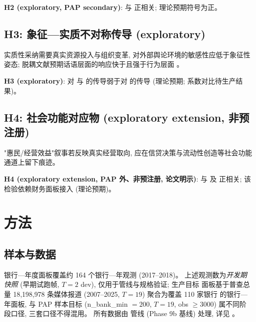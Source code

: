 \textbf{H2 (exploratory, PAP secondary)}:  与
 正相关; 理论预期符号为正。

\subsection{H3: 象征—实质不对称传导 (exploratory)}
实质性采纳需要真实资源投入与组织变革, 对外部舆论环境的敏感性应低于象征性
姿态; 脱耦文献预期话语层面的响应快于且强于行为层面
\parencite{kim2015greenwash,duchin2025greenwashing}。

\textbf{H3 (exploratory)}:  对
 与  的传导弱于对
 的传导 (理论预期; 系数对比待生产结果)。

\subsection{H4: 社会功能对应物 (exploratory extension, 非预注册)}
"惠民/经营效益"叙事若反映真实经营取向, 应在信贷决策与流动性创造等社会功能
通道上留下痕迹。

\textbf{H4 (exploratory extension, PAP 外、非预注册, 论文明示)}:
 与  及
 正相关; 该检验依赖财务面板接入 (理论预期)。

\section{方法}\label{sec:method}
\subsection{样本与数据}
银行—年度面板覆盖约 164 个银行—年观测 (2017--2018)。
上述观测数为\emph{开发期快照} (早期试跑帧, $T=2$ dev), 仅用于管线与规格验证; 生产目标
面板基于普查总量 18{,}198{,}978 条媒体报道 (2007--2025, $T=19$) 聚合为覆盖 110 家银行
的银行—年面板, 与 PAP 样本目标 (n\_bank\_min $= 200$, $T=19$, obs $\geq 3000$)
属不同阶段口径, 三套口径不得混用。
所有数据由  管线 (Phase 9b 基线) 处理,
详见 。

